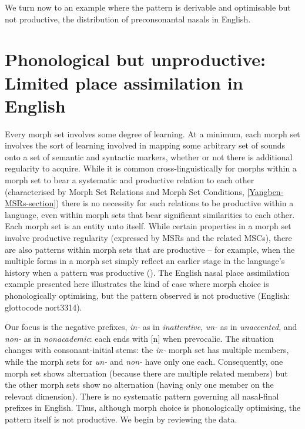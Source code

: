 We turn now to an example where the pattern is derivable and optimisable but not productive, the distribution of preconsonantal nasals in English.



\section{Phonological but unproductive: Limited place assimilation in English}\label{section_MS-independence}

\label{section_English-nasal-assimilation}\label{URs_English-nasals}

Every morph set involves  some degree of learning.  At a minimum, each morph set  involves the sort of learning involved in mapping some arbitrary set of sounds onto a set of semantic and syntactic markers, whether or not there is additional regularity to acquire.  While it is common cross-linguistically for morphs within a morph set to bear a systematic and productive relation to each other (characterised by Morph Set Relations and Morph Set Conditions,  \Sec\ref{Yangben-MSRs-section})  there is no necessity for such relations to be productive  within a language, even within morph sets that bear significant similarities to each other. Each morph set is an entity unto itself. {While certain properties in a morph set involve productive regularity (expressed by MSRs and the related MSCs), there are also patterns within morph sets that are  productive -- for example, when the multiple forms in a morph set simply reflect an earlier stage in the language's history when a pattern was productive (\citealt{Blevins:2004}).} The English nasal place assimilation example presented here illustrates the kind of case where morph choice is phonologically optimising, but the pattern observed is not productive (English: glottocode nort3314).%

Our focus is the negative prefixes, {\it in-} as in {\it inattentive}, {\it un-} as in {\it unaccented}, and {\it non-}  as in {\it nonacademic}: each ends with [n] when prevocalic. The situation changes with consonant-initial stems:  the {\it in-} morph set has multiple members, while the morph sets for {\it un-} and {\it non-} have only one each. Consequently,  one morph set shows alternation (because there are multiple related members) but the other morph sets show no alternation (having only one member on the relevant dimension). There is no systematic pattern governing all nasal-final prefixes in English. Thus, although morph choice is phonologically optimising, the pattern itself is not productive. We begin by reviewing the data.

